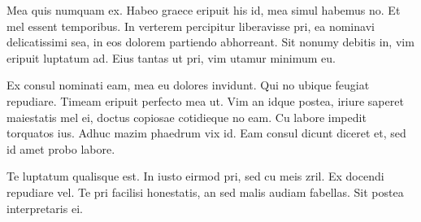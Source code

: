 \documentclass{article}
\begin{document}
Mea quis numquam ex. Habeo graece eripuit his id, mea simul habemus no. Et mel essent temporibus. In verterem percipitur liberavisse pri, ea nominavi delicatissimi sea, in eos dolorem partiendo abhorreant. Sit nonumy debitis in, vim eripuit luptatum ad. Eius tantas ut pri, vim utamur minimum eu.

Ex consul nominati eam, mea eu dolores invidunt. Qui no ubique feugiat repudiare. Timeam eripuit perfecto mea ut. Vim an idque postea, iriure saperet maiestatis mel ei, doctus copiosae cotidieque no eam. Cu labore impedit torquatos ius. Adhuc mazim phaedrum vix id. Eam consul dicunt diceret et, sed id amet probo labore.

Te luptatum qualisque est. In iusto eirmod pri, sed cu meis zril. Ex docendi repudiare vel. Te pri facilisi honestatis, an sed malis audiam fabellas. Sit postea interpretaris ei.
\end{document}
